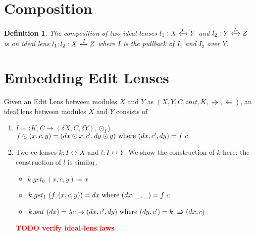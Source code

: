 \documentclass[a4paper,10pt]{article}
\newtheorem{definition}{Definition}
\newcommand{\finish}[1]{#1}
\newcommand{\comment}[1]{\finish{\textbf{\textcolor{red}{#1}}}}
\begin{document}
\section{Composition}
\begin{definition}
The composition of two ideal lenses $l_1: X \xleftrightarrow{I_1} Y$
and $l_2: Y \xleftrightarrow{I_2} Z$ is an ideal lens $l_1;l_2: X
\xleftrightarrow{I} Z$ where $I$ is the pullback of $I_1$ and $I_2$
over $Y$.
\end{definition}
	
\section{Embedding Edit Lenses}
Given an Edit Lens between modules $X$ and $Y$ as $(X,Y,C,init,K,\Rrightarrow,\Lleftarrow)$, an ideal lens between modules $X$ and $Y$ consists of
\begin{enumerate}

\item $I = \langle K, C \to (\delta X, C, \delta Y), \odot_I \rangle$ \\
      $f \odot (x, c, y) = (dx \odot x, c', dy \odot y) \textnormal{ where } (dx, c', dy) = f~c $ \\
\item Two ce-lenses $k: I \leftrightarrow X$ and $l : I \leftrightarrow Y$. We show the construction of $k$ here; the construction of $l$ is similar.
  \begin{itemize}
   \item $k.get_0~(x,c,y) = x$
   \item $k.get_1~(f, (x,c,y)) = dx \textnormal{ where } (dx, \_, \_) = f~c$
   \item $k.put~(dx) = \lambda c \to (dx, c', dy) \textnormal{ where } (dy, c') = k.\Rrightarrow(dx, c)$
  \end{itemize}
  
\comment{TODO verify ideal-lens laws}

\end{enumerate}
\end{document}
